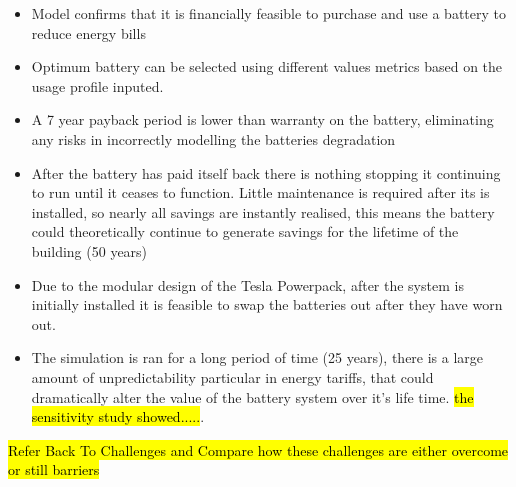 \begin{itemize}
\tightlist
\item
  Model confirms that it is financially feasible to purchase and use a
  battery to reduce energy bills
\item
  Optimum battery can be selected using different values metrics based
  on the usage profile inputed.
\item
  A 7 year payback period is lower than warranty on the battery,
  eliminating any risks in incorrectly modelling the batteries
  degradation
\item
  After the battery has paid itself back there is nothing stopping it
  continuing to run until it ceases to function. Little maintenance is
  required after its is installed, so nearly all savings are instantly
  realised, this means the battery could theoretically continue to
  generate savings for the lifetime of the building (50 years)
\item
  Due to the modular design of the Tesla Powerpack, after the system is
  initially installed it is feasible to swap the batteries out after
  they have worn out.
\item
  The simulation is ran for a long period of time (25 years), there is a
  large amount of unpredictability particular in energy tariffs, that
  could dramatically alter the value of the battery system over it's
  life time. \hl{the sensitivity study showed.....}.
\end{itemize}

\hl{Refer Back To Challenges and Compare how these challenges are either overcome or still barriers}

